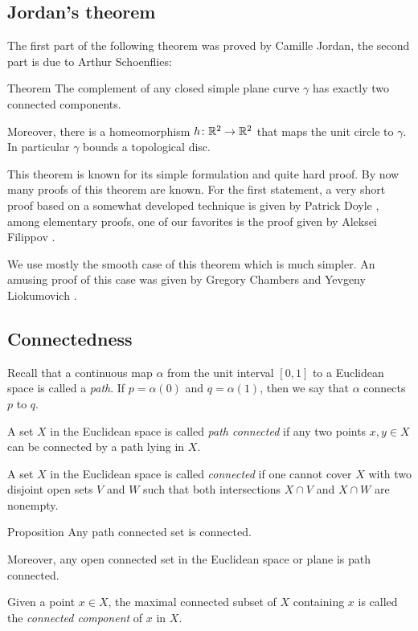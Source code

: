 \subsection*{Jordan's theorem}

The first part of the following theorem was proved by Camille Jordan, the second part is due to Arthur Schoenflies:

\begin{thm}{Theorem}\label{thm:jordan}
The complement of any closed simple plane curve $\gamma$ has exactly two connected components. 

Moreover, there is a homeomorphism $h\colon\mathbb{R}^2\to \mathbb{R}^2$ that maps the unit circle to $\gamma$.
In particular $\gamma$ bounds a topological disc.
\end{thm}

This theorem is known for its simple formulation and quite hard proof.
By now many proofs of this theorem are known.
For the first statement, a very short proof based on a somewhat developed technique is given by Patrick Doyle \cite{doyle},
among elementary proofs, one of our favorites is the proof given by Aleksei Filippov \cite{filippov}.

We use mostly the smooth case of this theorem which is much simpler.
An amusing proof of this case was given by Gregory Chambers and Yevgeny Liokumovich \cite{chambers-liokumovich}.

\subsection*{Connectedness}

Recall that a continuous map $\alpha$ from the unit interval $[0,1]$ to a Euclidean space is called a \emph{path}.
If $p=\alpha (0)$ and $q = \alpha (1)$, then we say that $\alpha$ connects $p$ to $q$.


A set $X$ in the Euclidean space is called \emph{path connected} if any two points $x,y\in X$ can be connected by a path lying in $X$.

A set $X$ in the Euclidean space is called \emph{connected} if one cannot cover $X$ with two disjoint open sets $V$ and $W$ such that both intersections $X\cap V$ and $X\cap W$ are nonempty.

\begin{thm}{Proposition}
Any path connected set is connected.

Moreover, any open connected set in the Euclidean space or  plane is path connected.
\end{thm}

Given a point $x\in X$, the maximal connected subset of $X$ containing $x$ is called the \emph{connected component} of $x$ in $X$.
